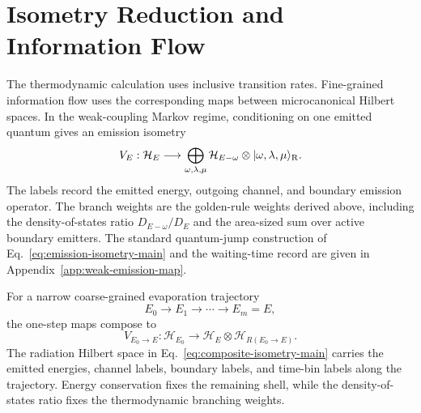 \documentclass[12pt]{article}
\newcommand{\ket}[1]{|#1\rangle}
\begin{document}
\section{Isometry Reduction and Information Flow}
\label{sec:isometry-flow}
\label{sec:information-flow}

The thermodynamic calculation uses inclusive transition rates.  Fine-grained
information flow uses the corresponding maps between microcanonical Hilbert
spaces.  In the weak-coupling Markov regime, conditioning on one emitted
quantum gives an emission isometry
\begin{equation}
    V_E:\mathcal H_E\longrightarrow
    \bigoplus_{\omega,\lambda,\mu}
    \mathcal H_{E-\omega}\otimes \ket{\omega,\lambda,\mu}_{\rm R}.
\label{eq:emission-isometry-main}
\end{equation}
The labels record the emitted energy, outgoing channel, and boundary emission
operator.  The branch weights are the golden-rule weights derived above,
including the density-of-states ratio
$D_{E-\omega}/D_E$ and the area-sized sum over active boundary emitters.  The
standard quantum-jump construction of Eq.~\eqref{eq:emission-isometry-main}
and the waiting-time record are given in Appendix~\ref{app:weak-emission-map}.

For a narrow coarse-grained evaporation trajectory
\begin{equation}
    E_0\to E_1\to \cdots \to E_m=E,
\end{equation}
the one-step maps compose to
\begin{equation}
    V_{E_0\to E}:
    \mathcal H_{E_0}\longrightarrow
    \mathcal H_E\otimes \mathcal H_{R(E_0\to E)} .
\label{eq:composite-isometry-main}
\end{equation}
The radiation Hilbert space in Eq.~\eqref{eq:composite-isometry-main} carries
the emitted energies, channel labels, boundary labels, and time-bin labels
along the trajectory.  Energy conservation fixes the remaining shell, while
the density-of-states ratio fixes the thermodynamic branching weights.
\end{document}
